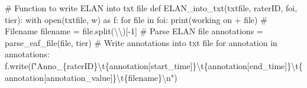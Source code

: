 \documentclass[
  letterpaper,
  DIV=11,
  numbers=noendperiod]{scrreprt}
\newenvironment{Shaded}{\begin{snugshade}}{\end{snugshade}}
\newcommand{\BuiltInTok}[1]{\textcolor[rgb]{0.00,0.23,0.31}{#1}}
\newcommand{\CharTok}[1]{\textcolor[rgb]{0.13,0.47,0.30}{#1}}
\newcommand{\CommentTok}[1]{\textcolor[rgb]{0.37,0.37,0.37}{#1}}
\newcommand{\ControlFlowTok}[1]{\textcolor[rgb]{0.00,0.23,0.31}{#1}}
\newcommand{\DecValTok}[1]{\textcolor[rgb]{0.68,0.00,0.00}{#1}}
\newcommand{\ImportTok}[1]{\textcolor[rgb]{0.00,0.46,0.62}{#1}}
\newcommand{\KeywordTok}[1]{\textcolor[rgb]{0.00,0.23,0.31}{#1}}
\newcommand{\NormalTok}[1]{\textcolor[rgb]{0.00,0.23,0.31}{#1}}
\newcommand{\OperatorTok}[1]{\textcolor[rgb]{0.37,0.37,0.37}{#1}}
\newcommand{\SpecialCharTok}[1]{\textcolor[rgb]{0.37,0.37,0.37}{#1}}
\newcommand{\SpecialStringTok}[1]{\textcolor[rgb]{0.13,0.47,0.30}{#1}}
\newcommand{\StringTok}[1]{\textcolor[rgb]{0.13,0.47,0.30}{#1}}
\begin{document}
\begin{Shaded}
\begin{Highlighting}[]
\CommentTok{\# Function to write ELAN into txt file}
\KeywordTok{def}\NormalTok{ ELAN\_into\_txt(txtfile, raterID, foi, tier):}
    \ControlFlowTok{with} \BuiltInTok{open}\NormalTok{(txtfile, }\StringTok{\textquotesingle{}w\textquotesingle{}}\NormalTok{) }\ImportTok{as}\NormalTok{ f:}
        \ControlFlowTok{for} \BuiltInTok{file} \KeywordTok{in}\NormalTok{ foi:}
            \BuiltInTok{print}\NormalTok{(}\StringTok{\textquotesingle{}working on \textquotesingle{}} \OperatorTok{+} \BuiltInTok{file}\NormalTok{)}
            \CommentTok{\# Filename}
\NormalTok{            filename }\OperatorTok{=} \BuiltInTok{file}\NormalTok{.split(}\StringTok{\textquotesingle{}}\CharTok{\textbackslash{}\textbackslash{}}\StringTok{\textquotesingle{}}\NormalTok{)[}\OperatorTok{{-}}\DecValTok{1}\NormalTok{]}
            \CommentTok{\# Parse ELAN file}
\NormalTok{            annotations }\OperatorTok{=}\NormalTok{ parse\_eaf\_file(}\BuiltInTok{file}\NormalTok{, tier)}
            \CommentTok{\# Write annotations into txt file}
            \ControlFlowTok{for}\NormalTok{ annotation }\KeywordTok{in}\NormalTok{ annotations:}
\NormalTok{                f.write(}\SpecialStringTok{f"Anno\_}\SpecialCharTok{\{}\NormalTok{raterID}\SpecialCharTok{\}}\CharTok{\textbackslash{}t}\SpecialCharTok{\{}\NormalTok{annotation[}\StringTok{\textquotesingle{}start\_time\textquotesingle{}}\NormalTok{]}\SpecialCharTok{\}}\CharTok{\textbackslash{}t}\SpecialCharTok{\{}\NormalTok{annotation[}\StringTok{\textquotesingle{}end\_time\textquotesingle{}}\NormalTok{]}\SpecialCharTok{\}}\CharTok{\textbackslash{}t}\SpecialCharTok{\{}\NormalTok{annotation[}\StringTok{\textquotesingle{}annotation\_value\textquotesingle{}}\NormalTok{]}\SpecialCharTok{\}}\CharTok{\textbackslash{}t}\SpecialCharTok{\{}\NormalTok{filename}\SpecialCharTok{\}}\CharTok{\textbackslash{}n}\SpecialStringTok{"}\NormalTok{)}
\end{Highlighting}
\end{Shaded}
\end{document}
